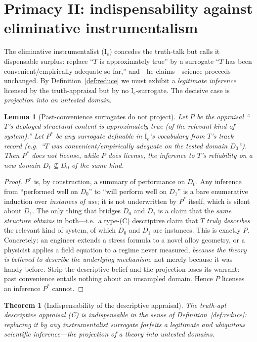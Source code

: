 \documentclass{amsart}
\theoremstyle{definition}
\theoremstyle{plain}
\newtheorem{lemma}{Lemma}
\newtheorem{theorem}{Theorem}
\begin{document}
\section{Primacy II: indispensability against eliminative instrumentalism}

The eliminative instrumentalist ($\mathrm I_e$) concedes the truth-talk but
calls it dispensable surplus: replace ``$T$ is approximately true'' by a
surrogate ``$T$ has been convenient/empirically adequate so far,'' and---he
claims---science proceeds unchanged. By Definition~\ref{def:reduce} we must
exhibit a \emph{legitimate inference} licensed by the truth-appraisal but by no
$\mathrm I_e$-surrogate. The decisive case is \emph{projection into an untested
domain}.

\begin{lemma}[Past-convenience surrogates do not project]\label{lem:noproject}
Let $P$ be the appraisal ``$T$'s deployed structural content is approximately
true (of the relevant kind of system).'' Let $P^{*}$ be any surrogate definable
in $\mathrm I_e$'s vocabulary from $T$'s track record (e.g.\ ``$T$ was
convenient/empirically adequate on the tested domain $D_0$''). Then $P^{*}$ does
not license, while $P$ does license, the inference to $T$'s reliability on a
\emph{new} domain $D_1\not\subseteq D_0$ of the same kind.
\end{lemma}

\begin{proof}
$P^{*}$ is, by construction, a summary of performance on $D_0$. Any inference
from ``performed well on $D_0$'' to ``will perform well on $D_1$'' is a bare
enumerative induction over \emph{instances of use}; it is not underwritten by
$P^{*}$ itself, which is silent about $D_1$. The only thing that bridges $D_0$
and $D_1$ is a claim that the \emph{same structure obtains} in both---i.e.\ a
type-(C) descriptive claim that $T$ \emph{truly describes} the relevant kind of
system, of which $D_0$ and $D_1$ are instances. This is exactly $P$. Concretely:
an engineer extends a stress formula to a novel alloy geometry, or a physicist
applies a field equation to a regime never measured, \emph{because the theory is
believed to describe the underlying mechanism}, not merely because it was handy
before. Strip the descriptive belief and the projection loses its warrant: past
convenience entails nothing about an unsampled domain. Hence $P$ licenses an
inference $P^{*}$ cannot.
\end{proof}

\begin{theorem}[Indispensability of the descriptive appraisal]\label{thm:indispensable}
The truth-apt descriptive appraisal (C) is \emph{indispensable} in the sense of
Definition~\ref{def:reduce}: replacing it by any instrumentalist surrogate
forfeits a legitimate and ubiquitous scientific inference---the projection of a
theory into untested domains.
\end{theorem}
\end{document}
